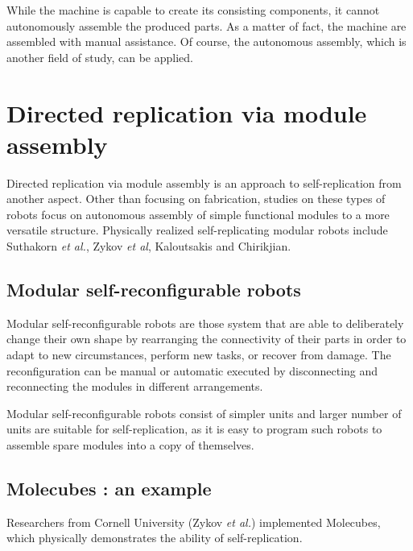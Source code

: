 \documentclass[12pt,twoside]{article}
\theoremstyle{plain}
\theoremstyle{definition}
\theoremstyle{remark}
\newcommand{\etal}{\textit{et al.}}
\begin{document}
While the machine is capable to create its consisting components, it cannot autonomously assemble the produced parts. As a matter of fact, the machine are assembled with manual assistance. Of course, the autonomous assembly, which is another field of study, can be applied.

\section{Directed replication via module assembly}
\label{sec:module}
Directed replication via module assembly is an approach to self-replication from another aspect. Other than focusing on fabrication, studies on these types of robots focus on autonomous assembly of simple functional modules to a more versatile structure. Physically realized self-replicating modular robots include Suthakorn \etal\cite{suthakorn_autonomous_2003}, Zykov \textit{et al}\cite{zykov_self-reproducing_2005}, Kaloutsakis and Chirikjian\cite{kaloutsakis_stochastic_2011}.

\subsection{Modular self-reconfigurable robots}
Modular self-reconfigurable robots are those system that are able to deliberately
change their own shape by rearranging the connectivity of their parts in order to
adapt to new circumstances, perform new tasks, or recover from damage\cite{yim_modular_2007}. The reconfiguration can be manual or automatic executed by disconnecting and reconnecting the modules in different arrangements.

Modular self-reconfigurable robots consist of simpler units and larger number of units are suitable for self-replication, as it is easy to program such robots to assemble spare modules into a copy of themselves. 

\subsection{Molecubes : an example}
Researchers from Cornell University (Zykov \etal) implemented Molecubes, which physically demonstrates the ability of self-replication\cite{zykov_self-reproducing_2005}\cite{zykov_evolved_2007}. 
\end{document}
